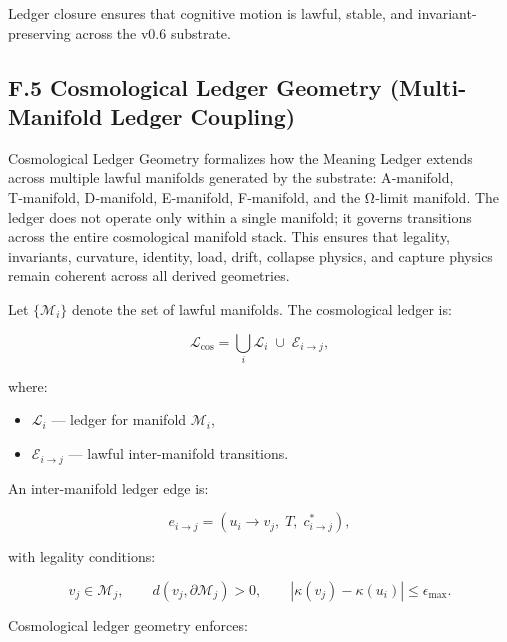 \medskip

\noindent Ledger closure ensures that cognitive motion is lawful, stable, and
invariant-preserving across the v0.6 substrate.



\subsection*{F.5 Cosmological Ledger Geometry (Multi-Manifold Ledger Coupling)}

\noindent Cosmological Ledger Geometry formalizes how the Meaning Ledger extends
across multiple lawful manifolds generated by the substrate: A‑manifold,
T‑manifold, D‑manifold, E‑manifold, F‑manifold, and the Ω‑limit manifold. The
ledger does not operate only within a single manifold; it governs transitions
across the entire cosmological manifold stack. This ensures that legality,
invariants, curvature, identity, load, drift, collapse physics, and capture
physics remain coherent across all derived geometries.

\medskip

\noindent Let $\{\mathcal{M}_i\}$ denote the set of lawful manifolds. The
cosmological ledger is:


\[
\mathcal{L}_{\mathrm{cos}} = \bigcup_i \mathcal{L}_i \;\cup\; \mathcal{E}_{i \rightarrow j},
\]


where:
\begin{itemize}
    \item $\mathcal{L}_i$ — ledger for manifold $\mathcal{M}_i$,
    \item $\mathcal{E}_{i \rightarrow j}$ — lawful inter-manifold transitions.
\end{itemize}

\medskip

\noindent An inter-manifold ledger edge is:


\[
e_{i \rightarrow j} = (u_i \rightarrow v_j,\; T,\; c^*_{i \rightarrow j}),
\]


with legality conditions:


\[
v_j \in \mathcal{M}_j,
\qquad
d(v_j, \partial \mathcal{M}_j) > 0,
\qquad
|\kappa(v_j) - \kappa(u_i)| \le \epsilon_{\max}.
\]



\medskip

\noindent Cosmological ledger geometry enforces:


